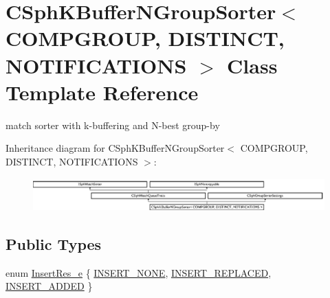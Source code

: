 \hypertarget{classCSphKBufferNGroupSorter}{\section{C\-Sph\-K\-Buffer\-N\-Group\-Sorter$<$ C\-O\-M\-P\-G\-R\-O\-U\-P, D\-I\-S\-T\-I\-N\-C\-T, N\-O\-T\-I\-F\-I\-C\-A\-T\-I\-O\-N\-S $>$ Class Template Reference}
\label{classCSphKBufferNGroupSorter}
}


match sorter with k-\/buffering and N-\/best group-\/by  


Inheritance diagram for C\-Sph\-K\-Buffer\-N\-Group\-Sorter$<$ C\-O\-M\-P\-G\-R\-O\-U\-P, D\-I\-S\-T\-I\-N\-C\-T, N\-O\-T\-I\-F\-I\-C\-A\-T\-I\-O\-N\-S $>$\-:\begin{figure}[H]
\begin{center}
\leavevmode
\includegraphics[height=1.255605cm]{classCSphKBufferNGroupSorter}
\end{center}
\end{figure}
\subsection*{Public Types}
\begin{DoxyCompactItemize}
\item 
enum \hyperlink{classCSphKBufferNGroupSorter_a19725f9743cf9362157871c8f61aad87}{Insert\-Res\-\_\-e} \{ \hyperlink{classCSphKBufferNGroupSorter_a19725f9743cf9362157871c8f61aad87a8621488162d88dd40efd395ee8fd01d4}{I\-N\-S\-E\-R\-T\-\_\-\-N\-O\-N\-E}, 
\hyperlink{classCSphKBufferNGroupSorter_a19725f9743cf9362157871c8f61aad87aeb3e5c24b89019422fe8536d8adf4b0c}{I\-N\-S\-E\-R\-T\-\_\-\-R\-E\-P\-L\-A\-C\-E\-D}, 
\hyperlink{classCSphKBufferNGroupSorter_a19725f9743cf9362157871c8f61aad87ae6cdb9b070a675250c9636b1bfd7e568}{I\-N\-S\-E\-R\-T\-\_\-\-A\-D\-D\-E\-D}
 \}
\end{DoxyCompactItemize}
